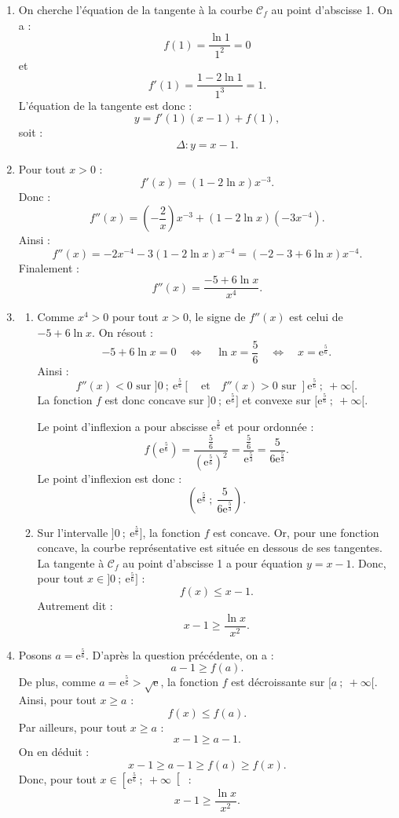 \documentclass[10pt]{article}
\providecommand{\e}{{\mathrm{e}}}
\begin{document}
\begin{enumerate}
	\item On cherche l'équation de la tangente à la courbe $\mathcal C_f$ au point d'abscisse 1.
	On a :
	\[
	f(1)=\dfrac{\ln 1}{1^2}=0
	\]
	et
	\[
	f'(1)=\dfrac{1-2\ln 1}{1^3}=1.
	\]
	L'équation de la tangente est donc :
	\[
	y=f'(1)(x-1)+f(1),
	\]
	soit :
	\[
	\Delta : y=x-1.
	\]

	\item Pour tout $x>0$ :
	\[
	f'(x)=(1-2\ln x)x^{-3}.
	\]
	Donc :
	\[
	f''(x)=\left(-\dfrac2x\right)x^{-3}+(1-2\ln x)(-3x^{-4}).
	\]
	Ainsi :
	\[
	f''(x)=-2x^{-4}-3(1-2\ln x)x^{-4}
	=\left(-2-3+6\ln x\right)x^{-4}.
	\]
	Finalement :
	\[
	f''(x)=\dfrac{-5+6\ln x}{x^4}.
	\]

	\item \begin{enumerate}
		\item Comme $x^4>0$ pour tout $x>0$, le signe de $f''(x)$ est celui de $-5+6\ln x$.
		On résout :
		\[
		-5+6\ln x=0
		\quad\Longleftrightarrow\quad
		\ln x=\dfrac56
		\quad\Longleftrightarrow\quad
		x=\e^{\frac56}.
		\]
		Ainsi :
		\[
		f''(x)<0 \text{ sur } ]0~;~\e^{\frac56}[
		\quad\text{et}\quad
		f''(x)>0 \text{ sur } ]\e^{\frac56}~;~+\infty[.
		\]
		La fonction $f$ est donc concave sur $]0~;~\e^{\frac56}]$ et convexe sur $[\e^{\frac56}~;~+\infty[$.

		Le point d'inflexion a pour abscisse $\e^{\frac56}$ et pour ordonnée :
		\[
		f\left(\e^{\frac56}\right)
		=\dfrac{\frac56}{\left(\e^{\frac56}\right)^2}
		=\dfrac{\frac56}{\e^{\frac53}}
		=\dfrac{5}{6\e^{\frac53}}.
		\]
		Le point d'inflexion est donc :
		\[
		\left(\e^{\frac56}~;~\dfrac{5}{6\e^{\frac53}}\right).
		\]

		\item Sur l'intervalle $]0~;~\e^{\frac56}]$, la fonction $f$ est concave.
		Or, pour une fonction concave, la courbe représentative est située en dessous de ses tangentes.
		La tangente à $\mathcal C_f$ au point d'abscisse 1 a pour équation $y=x-1$.
		Donc, pour tout $x\in ]0~;~\e^{\frac56}]$ :
		\[
		f(x)\leqslant x-1.
		\]
		Autrement dit :
		\[
		x-1\geqslant \dfrac{\ln x}{x^2}.
		\]
	\end{enumerate}

	\item Posons $a=\e^{\frac56}$.
	D'après la question précédente, on a :
	\[
	a-1\geqslant f(a).
	\]
	De plus, comme $a=\e^{\frac56}>\sqrt\e$, la fonction $f$ est décroissante sur $[a~;~+\infty[$.
	Ainsi, pour tout $x\geqslant a$ :
	\[
	f(x)\leqslant f(a).
	\]
	Par ailleurs, pour tout $x\geqslant a$ :
	\[
	x-1\geqslant a-1.
	\]
	On en déduit :
	\[
	x-1\geqslant a-1\geqslant f(a)\geqslant f(x).
	\]
	Donc, pour tout $x\in\left[\e^{\frac56}~;~+\infty\right[$ :
	\[
	x-1\geqslant \dfrac{\ln x}{x^2}.
	\]
\end{enumerate}
\end{document}
